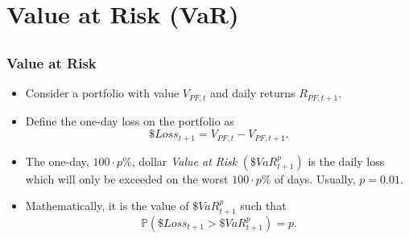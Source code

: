 

\frame{\titlepage}



\section[VaR]{Value at Risk (VaR)}\subsection*{}

\begin{frame}%

\frametitle{Value at Risk}

\begin{itemize}
\item Consider a portfolio with value $V_{PF,t}$ and daily returns $%
R_{PF,t+1}$.

\item Define the one-day loss on the portfolio as%
\begin{equation*}
\$Loss_{t+1}=V_{PF,t}-V_{PF,t+1}.
\end{equation*}

\item The one-day, $100\cdot p\%$, dollar \emph{\color{red}Value at Risk }$%
(\$VaR_{t+1}^{p})$ is the daily loss which will only be exceeded on the worst $100\cdot p \%$ of days. Usually, $p=0.01$.

\item Mathematically, it is the value of $\$VaR_{t+1}^{p}$ such that
\begin{equation*}
\mathbb{P} (\$Loss_{t+1}>\$VaR_{t+1}^{p})=p.
\end{equation*}
\end{itemize}

\end{frame}%

